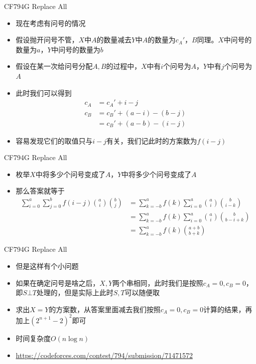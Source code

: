 \documentclass{beamer}
\begin{document}
\begin{frame}{CF794G Replace All}
    \begin{itemize}
        \item 现在考虑有问号的情况
        \item 假设抛开问号不管，$X$中$A$的数量减去$Y$中$A$的数量为$c_A'$，$B$同理。$X$中问号的数量为$a$，$Y$中问号的数量为$b$
        \item 假设在某一次给问号分配$A, B$的过程中，$X$中有$i$个问号为$A$，$Y$中有$j$个问号为$A$
        \item 此时我们可以得到
        $$\begin{aligned}
            c_A &= c_A' + i - j\\
            c_B &= c_B' + (a - i) - (b - j)\\
                &= c_B' + (a - b) - (i - j)
        \end{aligned}$$
        \item 容易发现它们的取值只与$i - j$有关，我们记此时的方案数为$f(i - j)$
    \end{itemize}
\end{frame}

\begin{frame}{CF794G Replace All}
    \begin{itemize}
        \item 枚举$X$中将多少个问号变成了$A$，$Y$中将多少个问号变成了$A$
        \item 那么答案就等于
        $$\begin{aligned}
            \sum_{i = 0}^{a} \sum_{j = 0}^{b} f(i - j){a\choose i}{b\choose j}
            &= \sum_{k = -b}^{a} f(k) \sum_{i = 0}^{a} {a\choose i}{b\choose i - k}\\
            &= \sum_{k = -b}^{a} f(k) \sum_{i = 0}^{a} {a\choose i}{b\choose b - i + k}\\
            &= \sum_{k = -b}^{a} f(k) {a + b\choose b + k}
        \end{aligned}$$
    \end{itemize}
\end{frame}

\begin{frame}{CF794G Replace All}
    \begin{itemize}
        \item 但是这样有个小问题
        \item 如果在确定问号是啥之后，$X,Y$两个串相同，此时我们是按照$c_A = 0, c_B = 0$，即$S\bot T$处理的，但是实际上此时$S, T$可以随便取
        \item 求出$X = Y$的方案数，从答案里面减去我们按照$c_A = 0, c_B = 0$计算的结果，再加上$\left(2^{n + 1} - 2\right)^2$即可
        \item 时间复杂度$O(n\log n)$
        \item \url{https://codeforces.com/contest/794/submission/71471572}
    \end{itemize}
\end{frame}
\end{document}

